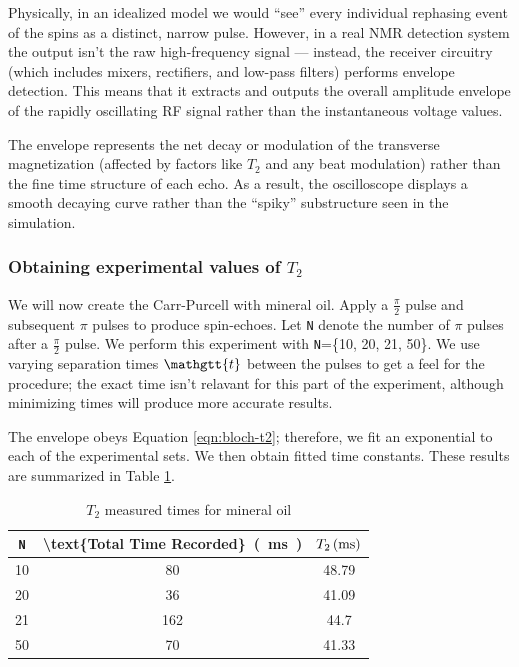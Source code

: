 \documentclass[
    floatfix,  %
    reprint,
    amsmath,
    amssymb,
    aps,
]{revtex4-2}
\newcommand{\halfpi}{\frac{\pi}{2}}
\newcommand{\taucode}{\mathgtt{t}}
\begin{document}
Physically, in an idealized model we would ``see'' every individual rephasing event of the spins as a distinct, narrow pulse. However, in a real NMR detection system the output isn't the raw high-frequency signal — instead, the receiver circuitry (which includes mixers, rectifiers, and low-pass filters) performs envelope detection. This means that it extracts and outputs the overall amplitude envelope of the rapidly oscillating RF signal rather than the instantaneous voltage values.

The envelope represents the net decay or modulation of the transverse magnetization (affected by factors like $T_2$ and any beat modulation) rather than the fine time structure of each echo. As a result, the oscilloscope displays a smooth decaying curve rather than the ``spiky'' substructure seen in the simulation.






\subsubsection{Obtaining experimental values of $T_2$}

We will now create the Carr-Purcell with mineral oil. Apply a $\halfpi$ pulse and subsequent $\pi$ pulses to produce spin-echoes. Let \texttt{N} denote the number of $\pi$ pulses after a $\halfpi$ pulse. We perform this experiment with \texttt{N}=\{10, 20, 21, 50\}. We use varying separation times $\taucode$ between the pulses to get a feel for the procedure; the exact time isn't relavant for this part of the experiment, although minimizing times will produce more accurate results.


The envelope obeys Equation \ref{eqn:bloch-t2}; therefore, we fit an exponential to each of the experimental sets. We then obtain fitted time constants. These results are summarized in Table \ref{tab:t2-times}.

\begin{table}[htbp]
    \centering
    \caption{$T_2$ measured times for mineral oil}
    \begin{tabular}{|c|c|c|}
        \hline
        \texttt{N} & \SI[parse-numbers=false]{\text{Total Time Recorded}}{(\milli\second)} & $\SI[parse-numbers=false]{T_2}{(\milli\second)}$\\
        \hline
        10    & 80    & 48.79 \\
        \hline
        20    & 36    & 41.09 \\
        \hline
        21    & 162   & 44.7 \\
        \hline
        50    & 70    & 41.33 \\
        \hline
    \end{tabular}%
    \label{tab:t2-times}%
\end{table}%
\end{document}
